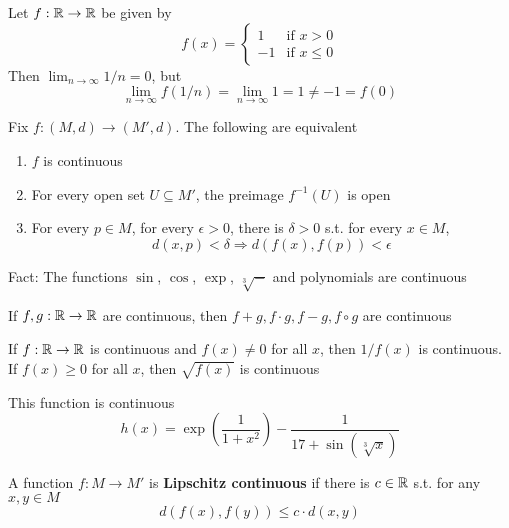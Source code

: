 \documentclass[11pt]{article}
\begin{document}
\begin{examplle}[]
Let \(f:\mathbb{R}\to\mathbb{R}\) be given by
\begin{equation*}
f(x)=
\begin{cases}
1&\text{if }x>0\\
-1&\text{if }x\le 0
\end{cases}
\end{equation*}
Then \(\lim_{n\to\infty}1/n=0\), but
\begin{equation*}
\lim_{n\to\infty}f(1/n)=\lim_{n\to\infty}1=1\neq-1=f(0)
\end{equation*}
\end{examplle}

\begin{proposition}[]
Fix \(f:(M,d)\to(M',d)\). The following are equivalent
\begin{enumerate}
\item \(f\) is continuous
\item For every open set \(U\subseteq M'\), the preimage \(f^{-1}(U)\) is open
\item For every \(p\in M\), for every \(\epsilon>0\), there is \(\delta>0\) s.t. for every \(x\in M\),
 \begin{equation*}
d(x,p)<\delta\Rightarrow d(f(x),f(p))<\epsilon
 \end{equation*}
\end{enumerate}
\end{proposition}

Fact: The functions \(\sin\), \(\cos\), \(\exp\), \(\sqrt[3]{-}\) and polynomials are continuous

\begin{proposition}[]
If \(f,g:\mathbb{R}\to\mathbb{R}\) are continuous, then \(f+g,f\cdot g,f-g,f\circ g\) are continuous
\end{proposition}

\begin{proposition}[]
If \(f:\mathbb{R}\to\mathbb{R}\) is continuous and \(f(x)\neq 0\) for all \(x\), then \(1/f(x)\) is continuous.
If \(f(x)\ge 0\) for all \(x\), then \(\sqrt{f(x)}\) is continuous
\end{proposition}

\begin{examplle}[]
This function is continuous
\begin{equation*}
h(x)=\exp\left( \frac{1}{1+x^2} \right)-\frac{1}{17+\sin(\sqrt[3]{x})}
\end{equation*}
\end{examplle}

\begin{definition}[]
A function \(f:M\to M'\) is \textbf{Lipschitz continuous} if there is \(c\in\mathbb{R}\) s.t. for any \(x,y\in M\)
\begin{equation*}
d(f(x),f(y))\le c\cdot d(x,y)
\end{equation*}
\end{definition}
\end{document}

